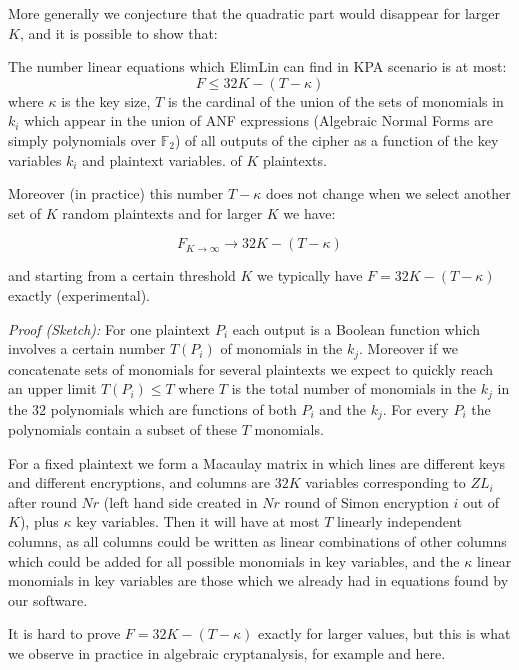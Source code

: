More generally we conjecture that the quadratic part would disappear for larger $K$, and it is possible to show that:

\begin{lemma}
	\label{Lem:UppBoundKP}
	The number linear equations which ElimLin can find in KPA scenario
	is at most:
	$$
	F \leq 32 K - (T-\kappa)
	$$
	where $\kappa$ is the key size,
	$T$ is the cardinal of the union of the sets of monomials in $k_i$
	which appear in the union of ANF expressions
	(Algebraic Normal Forms are simply polynomials over $\mathbb{F}_2$)
	of all outputs of the cipher as a function
	of the key variables $k_i$ and plaintext variables. %
	of $K$ plaintexts.
	
	Moreover (in practice) this number $T-\kappa$
	does not change when we select another set of $K$
	random plaintexts and for larger $K$ we have:
	
	$$
	F_{K\to\infty } \to 32 K - (T-\kappa)
	$$
	
	and starting from a certain threshold $K$ we typically have $F = 32 K - (T-\kappa)$ exactly (experimental).
	
\end{lemma}

\vskip-5pt
\noindent\emph{Proof (Sketch):}
For one plaintext $P_i$ each output is a Boolean function
which involves a certain number $T(P_i)$ of monomials in the $k_j$.
Moreover if we concatenate sets of monomials for several plaintexts
we expect to quickly reach an upper limit $T(P_i)\leq T$ where $T$
is the total number of monomials in the $k_j$ in the 32 polynomials
which are functions of both $P_i$ and the $k_j$.
For every $P_i$ the polynomials contain a subset of these $T$ monomials. 

For a fixed plaintext we form a Macaulay matrix
in which lines are different keys and different encryptions,
and columns are $32 K$ variables corresponding to $ZL_i$ after round $Nr$
(left hand side created in $Nr$ round of Simon encryption $i$ out of $K$),
plus $\kappa$ key variables.
Then it will have at most $T$ linearly independent columns,
as all columns could be written as linear combinations of other columns
which could be added for all possible monomials in key variables, and
the $\kappa$ linear monomials in key variables are those which we already had
in equations found by our software.

It is hard to prove $F=32 K - (T-\kappa)$ exactly for larger values, but this is what we observe in practice in algebraic cryptanalysis, for example \cite{XL2} and here. 


